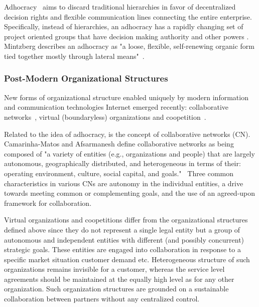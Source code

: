 Adhocracy~\cite{applegate1988,pearlson2009}  aims to discard traditional hierarchies in favor of decentralized decision rights and flexible communication lines connecting the entire enterprise. Specifically, instead of hierarchies, an adhocracy has a rapidly changing set of project oriented groups that have decision making authority and other powers  \cite{robbins1997}. Mintzberg describes an adhocracy as "a loose, flexible, self-renewing organic form tied together mostly through lateral means"~\cite{Mintzberg1979}.  

\subsubsection{Post-Modern Organizational Structures}

New forms of organizational structure enabled uniquely by modern information and communication technologies  Internet emerged recently:  collaborative networks~\cite{Camarinha-Matos2005}, virtual (boundaryless) organizations and coopetition~\cite{Bengtsson2000}.


Related to the idea of adhocracy, is the concept of collaborative networks (CN). Camarinha-Matos and Afsarmanesh define collaborative networks as being composed of "a variety of entities (e.g., organizations and people) that are largely autonomous, geographically distributed, and heterogeneous in terms of their: operating environment, culture, social capital, and goals."~\cite{Camarinha-Matos2005} Three common characteristics in various CNs are autonomy in the individual entities, a drive towards meeting common or complementing goals, and the use of an agreed-upon framework for collaboration. 

Virtual organizations and coopetitions differ from the organizational structures defined above since they do not represent a single legal entity but a group of autonomous and independent entities with different (and possibly concurrent) strategic goals. These entities are engaged into collaboration in response to a specific market situation customer demand etc.  Heterogeneous structure of such organizations remains invisible for a customer, whereas the service level agreements should be maintained at the equally high level as for any other organization. Such organization structures are grounded on a sustainable collaboration between partners without any centralized control.

